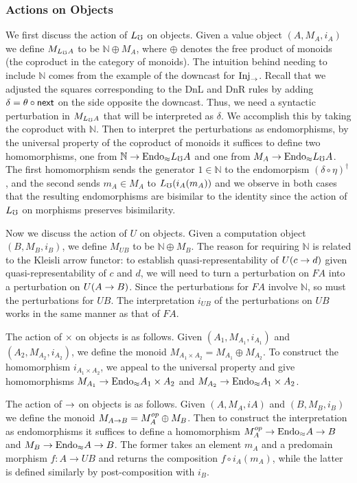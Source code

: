 \subsubsection{Actions on Objects}
We first discuss the action of $L_\mho$ on objects. Given a value object $(A, M_A,
i_A)$ we define $M_{L_\mho A}$ to be $\mathbb{N} \oplus M_A$, where $\oplus$
denotes the free product of monoids (the coproduct in the category of monoids).
The intuition behind needing to include $\mathbb{N}$ comes from the example of
the downcast for $\text{Inj}_\to$. Recall that we adjusted the squares corresponding to
the DnL and DnR rules by adding $\delta = \theta \circ \mathsf{next}$ on the side
opposite the downcast. Thus, we need a syntactic perturbation in $M_{L_\mho A}$
that will be interpreted as $\delta$. We accomplish this by taking the coproduct
with $\mathbb{N}$.
%
Then to interpret the perturbations as endomorphisms, by the universal property
of the coproduct of monoids it suffices to define two homomorphisms, one from
$\mathbb{N} \to \text{Endo}_\approx{L_\mho A}$ and one from $M_A \to \text{Endo}_\approx{L_\mho A}$.
The first homomorphism sends the generator $1 \in \mathbb{N}$ to the endomorpism
$(\delta \circ \eta)^\dagger$, and the second sends $m_A \in M_A$ to
$L_\mho(i_A(m_A))$ and we observe in both cases that the resulting endomorphisms
are bisimilar to the identity since the action of $L_\mho$ on morphisms preserves
bisimilarity.

Now we discuss the action of $U$ on objects. Given a computation object $(B,
M_B, i_B)$, we define $M_{UB}$ to be $\mathbb{N} \oplus M_B$. The reason for
requiring $\mathbb{N}$ is related to the Kleisli arrow functor: to establish
quasi-representability of $U(c \to d)$ given quasi-representability of $c$ and
$d$, we will need to turn a perturbation on $FA$ into a perturbation on $U(A
\to B)$. Since the perturbations for $FA$ involve $\mathbb{N}$, so must the
perturbations for $UB$. The interpretation $i_{UB}$ of the perturbations on $UB$
works in the same manner as that of $FA$.

The action of $\times$ on objects is as follows. Given $(A_1, M_{A_1}, i_{A_1})$
and $(A_2, M_{A_2}, i_{A_2})$, we define the monoid $M_{A_1 \times A_2} =
M_{A_1} \oplus M_{A_2}$. To construct the homomorphism $i_{A_1 \times A_2}$, we
appeal to the universal property and give homomorphisms $M_{A_1} \to
\text{Endo}_\approx{A_1 \times A_2}$ and $M_{A_2} \to \text{Endo}_\approx{A_1 \times A_2}$.



The action of $\to$ on objects is as follows. Given $(A, M_A, iA)$ and $(B,
M_B, i_B)$ we define the monoid $M_{A \to B} = M_A^{op} \oplus M_B$. Then to
construct the interpretation as endomorphisms it suffices to define a
homomorphism $M_A^{op} \to \text{Endo}_\approx{A \to B}$ and $M_B \to \text{Endo}_\approx{A
\to B}$. The former takes an element $m_A$ and a predomain morphism $f : A \to
UB$ and returns the composition $f \circ i_A(m_A)$, while the latter is defined
similarly by post-composition with $i_B$.

